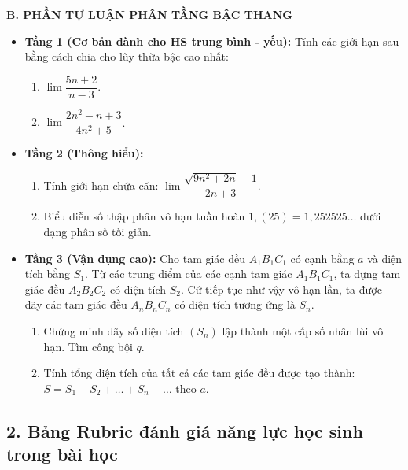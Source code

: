 \documentclass[12pt, a4paper]{article}
\begin{document}
\noindent \textbf{B. PHẦN TỰ LUẬN PHÂN TẦNG BẬC THANG}
\begin{itemize}[leftmargin=0.6cm]
    \item \textbf{Tầng 1 (Cơ bản dành cho HS trung bình - yếu):}
    Tính các giới hạn sau bằng cách chia cho lũy thừa bậc cao nhất:
    \begin{enumerate}[leftmargin=0.5cm]
        \item $\lim \dfrac{5n + 2}{n - 3}$.
        \item $\lim \dfrac{2n^2 - n + 3}{4n^2 + 5}$.
    \end{enumerate}

    \item \textbf{Tầng 2 (Thông hiểu):}
    \begin{enumerate}[leftmargin=0.5cm]
        \item Tính giới hạn chứa căn: $\lim \dfrac{\sqrt{9n^2 + 2n} - 1}{2n + 3}$.
        \item Biểu diễn số thập phân vô hạn tuần hoàn $1{,}(25) = 1{,}252525\dots$ dưới dạng phân số tối giản.
    \end{enumerate}

    \item \textbf{Tầng 3 (Vận dụng cao):}
    Cho tam giác đều $A_1B_1C_1$ có cạnh bằng $a$ và diện tích bằng $S_1$. Từ các trung điểm của các cạnh tam giác $A_1B_1C_1$, ta dựng tam giác đều $A_2B_2C_2$ có diện tích $S_2$. Cứ tiếp tục như vậy vô hạn lần, ta được dãy các tam giác đều $A_nB_nC_n$ có diện tích tương ứng là $S_n$.
    \begin{enumerate}[leftmargin=0.5cm]
        \item Chứng minh dãy số diện tích $(S_n)$ lập thành một cấp số nhân lùi vô hạn. Tìm công bội $q$.
        \item Tính tổng diện tích của tất cả các tam giác đều được tạo thành: $S = S_1 + S_2 + \dots + S_n + \dots$ theo $a$.
    \end{enumerate}
\end{itemize}

\subsection*{2. Bảng Rubric đánh giá năng lực học sinh trong bài học}
\end{document}
